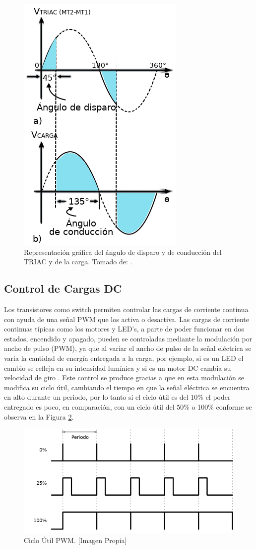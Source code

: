\begin{figure}[H]
	\centering
	\caption[Representación gráfica del ángulo de disparo y de conducción del TRIAC y de la carga.]{Representación gráfica del ángulo de disparo y de conducción del TRIAC y de la carga. Tomado de: \cite{CEKIT}.}
	\label{fig:triacgraph}
	\includegraphics[width=0.3\linewidth]{Imagenes/TRIAC_graph}
\end{figure}

\subsection{Control de Cargas DC}

Los transistores como switch permiten controlar las cargas de corriente continua con ayuda de una señal PWM que los activa o desactiva. Las cargas de corriente continuas típicas como los motores y LED's, a parte de poder funcionar en dos estados, encendido y apagado, pueden se controladas mediante la modulación por ancho de pulso (PWM), ya que al variar el ancho de pulso de la señal eléctrica se varia la cantidad de energía entregada a la carga, por ejemplo, si es un LED el cambio se refleja en su intensidad lumínica y si es un motor DC cambia su velocidad de giro \cite{PWM}. Este control se produce gracias a que en esta modulación se modifica su ciclo útil, cambiando el tiempo en que la señal eléctrica se encuentra en alto durante un periodo, por lo tanto si el ciclo útil es del 10\% el poder entregado es poco, en comparación, con un ciclo útil del 50\% o 100\% conforme se observa en la Figura \ref{fig:pwm-duty-800x396}.

\begin{figure}[H]
	\centering
	\caption[Ciclo Útil PWM.]{Ciclo Útil PWM. [Imagen Propia] }
	\label{fig:pwm-duty-800x396}
	\includegraphics[width=0.5\linewidth]{Imagenes/pwm}
\end{figure}



